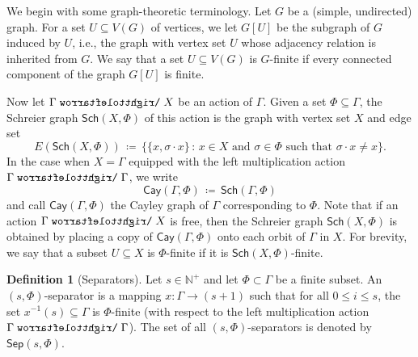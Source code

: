 \documentclass[11pt,reqno,psamsfonts]{amsart}
\theoremstyle{bfnote}
\theoremstyle{definition}
\newtheorem{defn}[theo]{Definition}
\theoremstyle{remark}
\newcommand{\0}{\varnothing}
\newcommand{\set}[1]{\{#1\}}
\renewcommand{\leq}{\leqslant}
\newcommand{\defeq}{\coloneqq}
\newcommand{\bemph}[1]{{\normalfont#1}}
\newcommand{\ep}[1]{\bemph{(}#1\bemph{)}}
\newcommand{\emphd}[1]{{\fontseries{b}\selectfont\textsf{#1}}}
\newcommand{\acts}{\mathrel{\reflectbox{$\righttoleftarrow$}}}
\newcommand{\G}{\Gamma}
\newcommand{\N}{\mathbb{N}}
\newcommand{\Cay}{\mathsf{Cay}}
\newcommand{\Sch}{\mathsf{Sch}}
\newcommand{\Sep}{\mathsf{Sep}}
\numberwithin{equation}{section}
\begin{document}
    
    We begin with some graph-theoretic terminology. Let $G$ be a (simple, undirected) graph. For a set $U \subseteq V(G)$ of vertices, we let $G[U]$ be the subgraph of $G$ \emphd{induced} by $U$, i.e., the graph with vertex set $U$ whose adjacency relation is inherited from $G$. We say that a set $U \subseteq V(G)$ is \emphd{$G$-finite} if every connected component of the graph $G[U]$ is finite.

     Now let $\G \acts X$ be an action of $\G$. Given a set $\Phi \subseteq \G$, the \emphd{Schreier graph} $\Sch(X, \Phi)$ of this action is the graph with vertex set $X$ and edge set
    \[
        E(\Sch(X,\Phi)) \,\defeq\, \big\{\set{x, \sigma \cdot x} \,:\, x \in X \text{ and } \sigma \in \Phi \text{ such that } \sigma \cdot x \neq x\big\}.
    \]
    In the case when $X = \G$ equipped with the left multiplication action $\G \acts \G$, we write \[\Cay(\G, \Phi) \,\defeq\, \Sch(\G, \Phi)\] and call $\Cay(\G,\Phi)$ the \emphd{Cayley graph} of $\G$ corresponding to $\Phi$. Note that if an action $\G \acts X$ is free, then the Schreier graph $\Sch(X, \Phi)$ is obtained by placing a copy of $\Cay(\G,\Phi)$ onto each orbit of $\G$ in $X$. For brevity, we say that a subset $U \subseteq X$ is \emphd{$\Phi$-finite} if it is $\Sch(X,\Phi)$-finite.

    \begin{defn}[Separators]\label{defn:sep}
        Let $s \in \N^+$ and let $\Phi \subset \G$ be a finite subset. An \emphd{$(s,\Phi)$-separator} is a mapping $x \colon \G \to (s+1)$ such that %
        for all $0 \leq i \leq s$, the set $x^{-1}(s) \subseteq \G$ is
        $\Phi$-finite \ep{with respect to the left multiplication action $\G \acts \G$}. The set of all $(s,\Phi)$-separators is denoted by $\Sep(s,\Phi)$.
    \end{defn}
\end{document}
